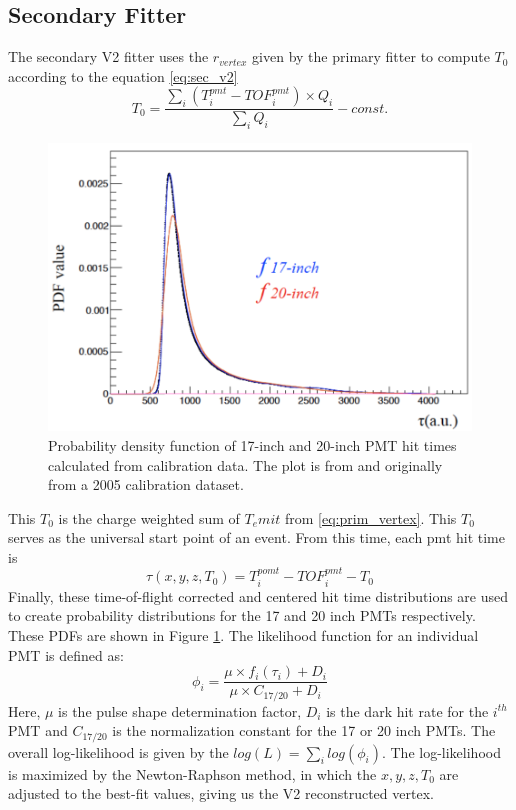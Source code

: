 \subsection{Secondary Fitter}
The secondary V2 fitter uses the $r_{vertex}$ given by the primary fitter to compute $T_0$ according to the equation \ref{eq:sec_v2}
\begin{equation}
	T_0 = \frac{\sum_i \left(T_i^{pmt}-TOF^{pmt}_i\right)\times Q_i}{\sum_iQ_i}- const.
	\label{eq:sec_v2}
\end{equation}
\begin{figure}[htb]
	\centering
	\includegraphics[scale=0.4]{pmt_dist.png}
	\caption{Probability density function of 17-inch and 20-inch PMT hit times calculated from calibration data. The plot is from \cite{ozaki_phd} and originally from a 2005 calibration dataset.}
	\label{fig:pmt_pdfs}
\end{figure}
This $T_0$ is the charge weighted sum of $T_emit$ from \ref{eq:prim_vertex}. This $T_0$ serves as the universal start point of an event. From this time, each pmt hit time is
\begin{equation}
	\tau(x,y,z,T_0) = T^{pomt}_i-TOF_i^{pmt}-T_0
\end{equation}
Finally, these time-of-flight corrected and centered hit time distributions are used to create probability distributions for the 17 and 20 inch PMTs respectively. These PDFs are shown in Figure \ref{fig:pmt_pdfs}. The likelihood function for an individual PMT is defined as:
\begin{equation}
	\phi_i =\frac{\mu\times f_i(\tau_i)+D_i}{\mu\times C_{17/20}+D_i}
\end{equation}
Here, $\mu$ is the pulse shape determination factor, $D_i$ is the dark hit rate for the $i^{th}$ PMT and $C_{17/20}$ is the normalization constant for the 17 or 20 inch PMTs. The overall log-likelihood is given by the $log(L)=\sum_ilog(\phi_i)$. The log-likelihood is maximized by the Newton-Raphson method, in which the $x,y,z,T_0$ are adjusted to the best-fit values, giving us the V2 reconstructed vertex.

